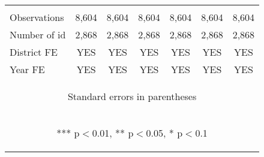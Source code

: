\begin{center}
\begin{tabular}{lcccccc}
\vspace{4pt} & \begin{footnotesize}\end{footnotesize} & \begin{footnotesize}\end{footnotesize} & \begin{footnotesize}\end{footnotesize} & \begin{footnotesize}\end{footnotesize} & \begin{footnotesize}\end{footnotesize} & \begin{footnotesize}\end{footnotesize} \\
Observations & 8,604 & 8,604 & 8,604 & 8,604 & 8,604 & 8,604 \\
Number of id & 2,868 & 2,868 & 2,868 & 2,868 & 2,868 & 2,868 \\
District FE & YES & YES & YES & YES & YES & YES \\
 Year FE & YES & YES & YES & YES & YES & YES \\ \hline
\multicolumn{7}{c}{\begin{footnotesize} Standard errors in parentheses\end{footnotesize}} \\
\multicolumn{7}{c}{\begin{footnotesize} *** p$<$0.01, ** p$<$0.05, * p$<$0.1\end{footnotesize}} \\
\end{tabular}
\end{center}
